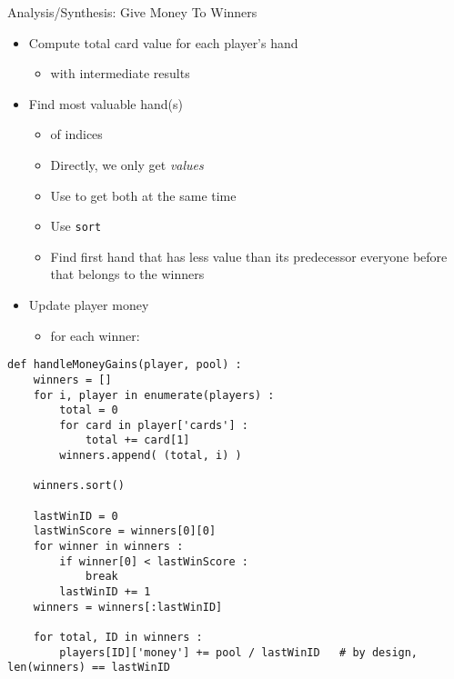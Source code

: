 \begin{frame}{Analysis/Synthesis: Give Money To Winners}
%
\begin{itemize}
\item Compute total card value for each player's hand
	\begin{itemize}
	\item {} with intermediate results
	\end{itemize}
\item Find most valuable hand(s)
	\begin{itemize}
	\item {} of indices
	\item Directly, we only get \emph{values}
	\item Use  to get both at the same time
	\item Use \texttt{sort}
	\item Find first hand that has less value than its predecessor \Thus everyone before that belongs to the winners
	\end{itemize}
\item Update player money
	\begin{itemize}
	\item for each winner: 
	\end{itemize}
\end{itemize}
%
\end{frame}


\begin{frame}[fragile]
%
\begin{codebox}
\begin{verbatim}
def handleMoneyGains(player, pool) :
    winners = []
    for i, player in enumerate(players) :
        total = 0
        for card in player['cards'] :
            total += card[1]
        winners.append( (total, i) )
    
    winners.sort()
    
    lastWinID = 0
    lastWinScore = winners[0][0]
    for winner in winners :
        if winner[0] < lastWinScore :
            break
        lastWinID += 1
    winners = winners[:lastWinID]
    
    for total, ID in winners :
        players[ID]['money'] += pool / lastWinID   # by design, len(winners) == lastWinID
\end{verbatim}
\end{codebox}
%
\end{frame}

